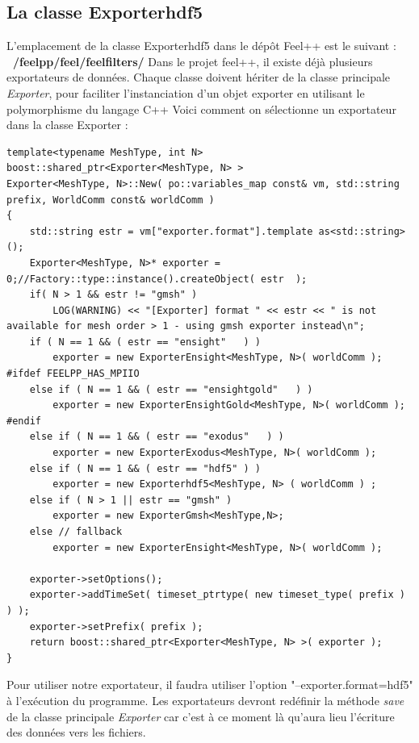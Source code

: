 \documentclass[12pt]{article}
\begin{document}
\subsection {La classe Exporterhdf5}
L'emplacement de la classe Exporterhdf5 dans le dépôt Feel++ est le suivant : \textbf{~/feelpp/feel/feelfilters/} \newline
Dans le projet feel++, il existe déjà plusieurs exportateurs de données. Chaque classe doivent hériter de la classe principale \emph{Exporter}, pour faciliter l'instanciation d'un objet exporter en utilisant le polymorphisme du langage C++ \newline
Voici comment on sélectionne un exportateur dans la classe Exporter : 
\begin{lstlisting}
template<typename MeshType, int N>
boost::shared_ptr<Exporter<MeshType, N> >
Exporter<MeshType, N>::New( po::variables_map const& vm, std::string prefix, WorldComm const& worldComm )
{
    std::string estr = vm["exporter.format"].template as<std::string>();
    Exporter<MeshType, N>* exporter =  0;//Factory::type::instance().createObject( estr  );
    if( N > 1 && estr != "gmsh" )
        LOG(WARNING) << "[Exporter] format " << estr << " is not available for mesh order > 1 - using gmsh exporter instead\n";
    if ( N == 1 && ( estr == "ensight"   ) )
        exporter = new ExporterEnsight<MeshType, N>( worldComm );
#ifdef FEELPP_HAS_MPIIO
    else if ( N == 1 && ( estr == "ensightgold"   ) )
        exporter = new ExporterEnsightGold<MeshType, N>( worldComm );
#endif
    else if ( N == 1 && ( estr == "exodus"   ) )
        exporter = new ExporterExodus<MeshType, N>( worldComm );
    else if ( N == 1 && ( estr == "hdf5" ) )
        exporter = new Exporterhdf5<MeshType, N> ( worldComm ) ;
    else if ( N > 1 || estr == "gmsh" )
        exporter = new ExporterGmsh<MeshType,N>;
    else // fallback
        exporter = new ExporterEnsight<MeshType, N>( worldComm );

    exporter->setOptions();
    exporter->addTimeSet( timeset_ptrtype( new timeset_type( prefix ) ) );
    exporter->setPrefix( prefix );
    return boost::shared_ptr<Exporter<MeshType, N> >( exporter );
}
\end{lstlisting}
Pour utiliser notre exportateur, il faudra utiliser l'option "--exporter.format=hdf5" à l'exécution du programme.\newline
Les exportateurs devront redéfinir la méthode \emph{save} de la classe principale \emph{Exporter} car c'est à ce moment là qu'aura lieu l'écriture des données vers les fichiers.
\end{document}
